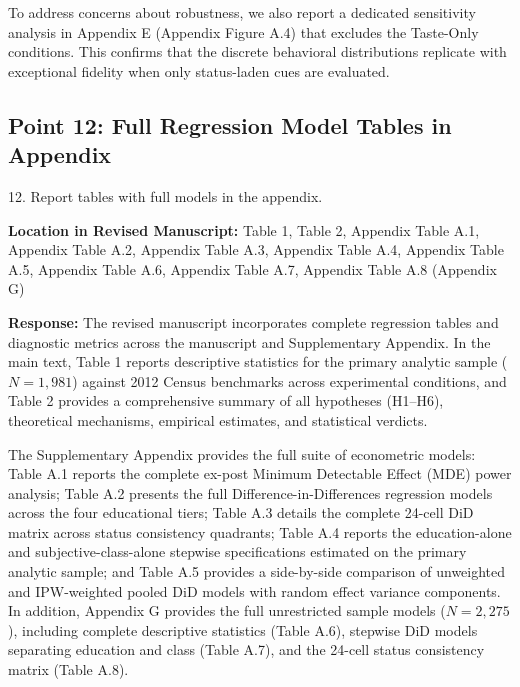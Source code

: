 \documentclass[11pt, letterpaper]{article}
\begin{document}
To address concerns about robustness, we also report a dedicated sensitivity analysis in Appendix E (Appendix Figure A.4) that excludes the Taste-Only conditions. This confirms that the discrete behavioral distributions replicate with exceptional fidelity when only status-laden cues are evaluated.

\vspace{10pt}

\subsection*{Point 12: Full Regression Model Tables in Appendix}

\begin{reviewercomment}
12. Report tables with full models in the appendix.
\end{reviewercomment}

\textbf{Location in Revised Manuscript:} Table 1, Table 2, Appendix Table A.1, Appendix Table A.2, Appendix Table A.3, Appendix Table A.4, Appendix Table A.5, Appendix Table A.6, Appendix Table A.7, Appendix Table A.8 (Appendix G)

\textbf{Response:}
The revised manuscript incorporates complete regression tables and diagnostic metrics across the manuscript and Supplementary Appendix. In the main text, Table 1 reports descriptive statistics for the primary analytic sample ($N = 1,981$) against 2012 Census benchmarks across experimental conditions, and Table 2 provides a comprehensive summary of all hypotheses (H1--H6), theoretical mechanisms, empirical estimates, and statistical verdicts.

The Supplementary Appendix provides the full suite of econometric models: Table A.1 reports the complete ex-post Minimum Detectable Effect (MDE) power analysis; Table A.2 presents the full Difference-in-Differences regression models across the four educational tiers; Table A.3 details the complete 24-cell DiD matrix across status consistency quadrants; Table A.4 reports the education-alone and subjective-class-alone stepwise specifications estimated on the primary analytic sample; and Table A.5 provides a side-by-side comparison of unweighted and IPW-weighted pooled DiD models with random effect variance components. In addition, Appendix G provides the full unrestricted sample models ($N = 2,275$), including complete descriptive statistics (Table A.6), stepwise DiD models separating education and class (Table A.7), and the 24-cell status consistency matrix (Table A.8).
\end{document}
